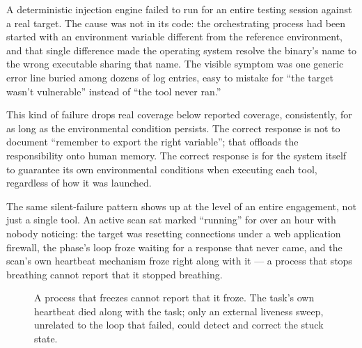 \documentclass[10pt]{article}
\begin{document}
A deterministic injection engine failed to run for an entire testing session against a real target. The cause was not in its code: the orchestrating process had been started with an environment variable different from the reference environment, and that single difference made the operating system resolve the binary's name to the wrong executable sharing that name. The visible symptom was one generic error line buried among dozens of log entries, easy to mistake for ``the target wasn't vulnerable'' instead of ``the tool never ran.''

This kind of failure drops real coverage below reported coverage, consistently, for as long as the environmental condition persists. The correct response is not to document ``remember to export the right variable''; that offloads the responsibility onto human memory. The correct response is for the system itself to guarantee its own environmental conditions when executing each tool, regardless of how it was launched.

The same silent-failure pattern shows up at the level of an entire engagement, not just a single tool. An active scan sat marked ``running'' for over an hour with nobody noticing: the target was resetting connections under a web application firewall, the phase's loop froze waiting for a response that never came, and the scan's own heartbeat mechanism froze right along with it --- a process that stops breathing cannot report that it stopped breathing.

\begin{figure}[h]
\centering
{}
\caption{A process that freezes cannot report that it froze. The task's own heartbeat died along with the task; only an external liveness sweep, unrelated to the loop that failed, could detect and correct the stuck state.}
\label{fig:liveness}
\end{figure}
\end{document}
